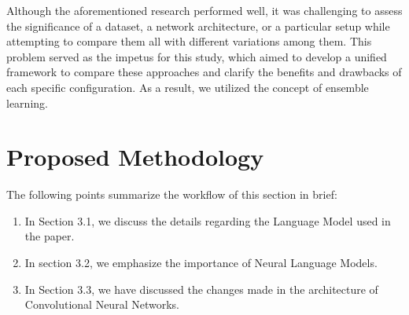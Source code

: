 Although the aforementioned research performed well, it was challenging to assess the significance of a dataset, a network architecture, or a particular setup while attempting to compare them all with different variations among them. This problem served as the impetus for this study, which aimed to develop a unified framework to compare these approaches and clarify the benefits and drawbacks of each specific configuration. As a result, we utilized the concept of ensemble learning.








\section{Proposed Methodology}

The following points summarize the workflow of this section in brief:


\begin{enumerate}
    \item In Section 3.1, we discuss the details regarding the Language Model used in the paper.
    \item In section 3.2, we emphasize the importance of Neural Language Models.
    \item In Section 3.3, we have discussed the changes made in the architecture of Convolutional Neural Networks.
\end{enumerate}


